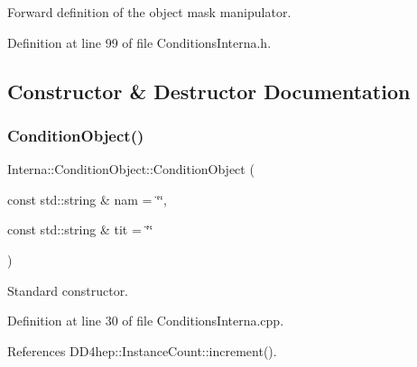 Forward definition of the object mask manipulator. 



Definition at line 99 of file Conditions\+Interna.\+h.



\subsection{Constructor \& Destructor Documentation}
\hypertarget{class_d_d4hep_1_1_conditions_1_1_interna_1_1_condition_object_af7f5469b66f682e5798d5a7168c16cea}{}\label{class_d_d4hep_1_1_conditions_1_1_interna_1_1_condition_object_af7f5469b66f682e5798d5a7168c16cea} 
\subsubsection{\texorpdfstring{Condition\+Object()}{ConditionObject()}}
{\footnotesize\ttfamily Interna\+::\+Condition\+Object\+::\+Condition\+Object (\begin{DoxyParamCaption}\item[{const std\+::string \&}]{nam = {\ttfamily \char`\"{}\char`\"{}},  }\item[{const std\+::string \&}]{tit = {\ttfamily \char`\"{}\char`\"{}} }\end{DoxyParamCaption})}



Standard constructor. 



Definition at line 30 of file Conditions\+Interna.\+cpp.



References D\+D4hep\+::\+Instance\+Count\+::increment().

\hypertarget{class_d_d4hep_1_1_conditions_1_1_interna_1_1_condition_object_a37f67e8fcbbb726ba44d7f043ec5bcdf}{}\label{class_d_d4hep_1_1_conditions_1_1_interna_1_1_condition_object_a37f67e8fcbbb726ba44d7f043ec5bcdf} 
